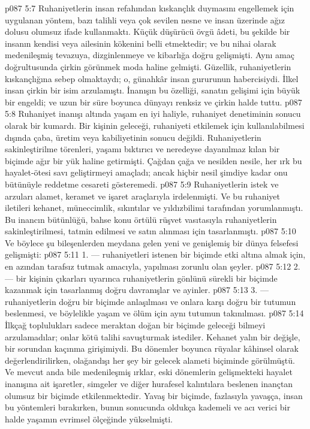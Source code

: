 \vs p087 5:7 Ruhaniyetlerin insan refahından kıskançlık duymasını engellemek için uygulanan yöntem, bazı talihli veya çok sevilen nesne ve insan üzerinde ağız dolusu olumsuz ifade kullanmaktı. Küçük düşürücü övgü âdeti, bu şekilde bir insanın kendisi veya ailesinin kökenini belli etmektedir; ve bu nihai olarak medenileşmiş tevazuya, dizginlenmeye ve kibarlığa doğru gelişmişti. Aynı amaç doğrultusunda çirkin görünmek moda haline gelmişti. Güzellik, ruhaniyetlerin kıskançlığına sebep olmaktaydı; o, günahkâr insan gururunun habercisiydi. İlkel insan çirkin bir isim arzulamıştı. İnanışın bu özelliği, sanatın gelişimi için büyük bir engeldi; ve uzun bir süre boyunca dünyayı renksiz ve çirkin halde tuttu.
\vs p087 5:8 Ruhaniyet inanışı altında yaşam en iyi haliyle, ruhaniyet denetiminin sonucu olarak bir kumardı. Bir kişinin geleceği, ruhaniyeti etkilemek için kullanılabilmesi dışında çaba, üretim veya kabiliyetinin sonucu değildi. Ruhaniyetlerin sakinleştirilme törenleri, yaşamı bıktırıcı ve neredeyse dayanılmaz kılan bir biçimde ağır bir yük haline getirmişti. Çağdan çağa ve nesilden nesile, her ırk bu hayalet\hyp{}ötesi savı geliştirmeyi amaçladı; ancak hiçbir nesil şimdiye kadar onu bütünüyle reddetme cesareti gösteremedi.
\vs p087 5:9 Ruhaniyetlerin istek ve arzuları alamet, keramet ve işaret araçlarıyla irdelenmişti. Ve bu ruhaniyet iletileri kehanet, müneccimlik, sıkıntılar ve yıldızbilimi tarafından yorumlanmıştı. Bu inancın bütünlüğü, bahse konu örtülü rüşvet vasıtasıyla ruhaniyetlerin sakinleştirilmesi, tatmin edilmesi ve satın alınması için tasarlanmıştı.
\vs p087 5:10 Ve böylece şu bileşenlerden meydana gelen yeni ve genişlemiş bir dünya felsefesi gelişmişti:
\vs p087 5:11 1.\bibnobreakspace {} --- ruhaniyetleri istenen bir biçimde etki altına almak için, en azından tarafsız tutmak amacıyla, yapılması zorunlu olan şeyler.
\vs p087 5:12 2.\bibnobreakspace {} --- bir kişinin çıkarları uyarınca ruhaniyetlerin gönlünü sürekli bir biçimde kazanmak için tasarlanmış doğru davranışlar ve ayinler.
\vs p087 5:13 3.\bibnobreakspace {} --- ruhaniyetlerin doğru bir biçimde anlaşılması ve onlara karşı doğru bir tutumun beslenmesi, ve böylelikle yaşam ve ölüm için aynı tutumun takınılması.
\vs p087 5:14 İlkçağ toplulukları sadece meraktan doğan bir biçimde geleceği bilmeyi arzulamadılar; onlar kötü talihi savuşturmak istediler. Kehanet yalın bir değişle, bir sorundan kaçınma girişimiydi. Bu dönemler boyunca rüyalar kâhinsel olarak değerlendirilirken, olağandışı her şey bir gelecek alameti biçiminde görülmüştü. Ve mevcut anda bile medenileşmiş ırklar, eski dönemlerin gelişmekteki hayalet inanışına ait işaretler, simgeler ve diğer hurafesel kalıntılara beslenen inançtan olumsuz bir biçimde etkilenmektedir. Yavaş bir biçimde, fazlasıyla yavaşça, insan bu yöntemleri bırakırken, bunun sonucunda oldukça kademeli ve acı verici bir halde yaşamın evrimsel ölçeğinde yükselmişti.
